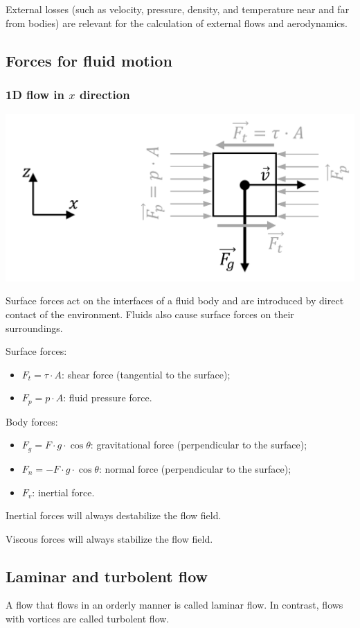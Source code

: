 \documentclass{article}
\begin{document}
External losses (such as velocity, pressure, density, and temperature
near and far from bodies) are relevant for the calculation of external flows
and aerodynamics.

\subsection{Forces for fluid motion}
\subsubsection{1D flow in $x$ direction}
\begin{center}
    \includegraphics[width=.6\textwidth]{media/Kraftgleichgewicht.png}
\end{center}

Surface forces act on the interfaces of a fluid body and are introduced by
direct contact of the environment. Fluids also cause surface forces on
their surroundings.

Surface forces:
\begin{itemize}
    \item $F_t = \tau\cdot A$: shear force (tangential to the surface);
    \item $F_p = p\cdot A$: fluid pressure force.
\end{itemize}

Body forces:
\begin{itemize}
    \item $F_g = F\cdot g\cdot \cos\theta$: gravitational force (perpendicular to the surface);
    \item $F_n = -F\cdot g\cdot \cos\theta$: normal force (perpendicular to the surface);
    \item $F_v$: inertial force.
\end{itemize}

Inertial forces will always destabilize the flow field.

Viscous forces will always stabilize the flow field.

\newpage
\subsection{Laminar and turbolent flow}
A flow that flows in an orderly manner is called laminar flow. In contrast,
flows with vortices are called turbolent flow.
\end{document}
